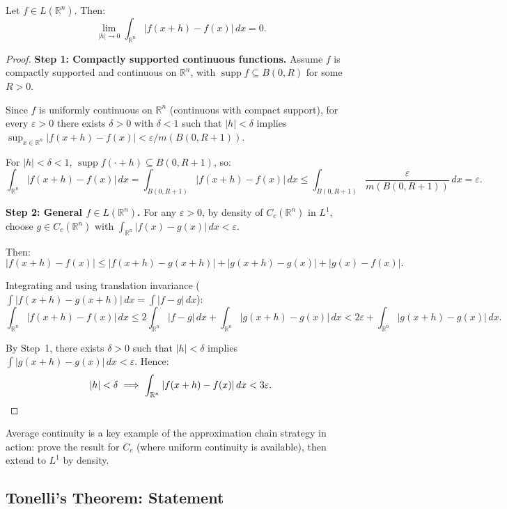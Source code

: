 \documentclass[11pt]{report}
\begin{document}
\begin{thmbox}
Let $f \in L(\mathbb{R}^n)$. Then:
\[
\lim_{|h| \to 0} \int_{\mathbb{R}^n} |f(x + h) - f(x)|\,dx = 0.
\]
\end{thmbox}

\begin{proof}
\textbf{Step 1: Compactly supported continuous functions.} Assume $f$ is compactly supported and continuous on $\mathbb{R}^n$, with $\operatorname{supp} f \subseteq B(0, R)$ for some $R > 0$.

Since $f$ is uniformly continuous on $\mathbb{R}^n$ (continuous with compact support), for every $\varepsilon > 0$ there exists $\delta > 0$ with $\delta < 1$ such that $|h| < \delta$ implies $\sup_{x \in \mathbb{R}^n} |f(x+h) - f(x)| < \varepsilon / m(B(0, R+1))$.

For $|h| < \delta < 1$, $\operatorname{supp} f(\cdot + h) \subseteq B(0, R+1)$, so:
\[
\int_{\mathbb{R}^n} |f(x+h) - f(x)|\,dx = \int_{B(0, R+1)} |f(x+h) - f(x)|\,dx \leq \int_{B(0, R+1)} \frac{\varepsilon}{m(B(0, R+1))}\,dx = \varepsilon.
\]

\textbf{Step 2: General $f \in L(\mathbb{R}^n)$.} For any $\varepsilon > 0$, by density of $C_c(\mathbb{R}^n)$ in $L^1$, choose $g \in C_c(\mathbb{R}^n)$ with $\int_{\mathbb{R}^n} |f(x) - g(x)|\,dx < \varepsilon$.

Then:
\[
|f(x+h) - f(x)| \leq |f(x+h) - g(x+h)| + |g(x+h) - g(x)| + |g(x) - f(x)|.
\]

Integrating and using translation invariance ($\int |f(x+h) - g(x+h)|\,dx = \int |f - g|\,dx$):
\[
\int_{\mathbb{R}^n} |f(x+h) - f(x)|\,dx \leq 2\int_{\mathbb{R}^n} |f - g|\,dx + \int_{\mathbb{R}^n} |g(x+h) - g(x)|\,dx < 2\varepsilon + \int_{\mathbb{R}^n} |g(x+h) - g(x)|\,dx.
\]

By Step~1, there exists $\delta > 0$ such that $|h| < \delta$ implies $\int |g(x+h) - g(x)|\,dx < \varepsilon$. Hence:
\[
|h| < \delta \implies \int_{\mathbb{R}^n} |f(x+h) - f(x)|\,dx < 3\varepsilon. \qedhere
\]
\end{proof}

\begin{rembox}
Average continuity is a key example of the approximation chain strategy in action: prove the result for $C_c$ (where uniform continuity is available), then extend to $L^1$ by density.
\end{rembox}

\subsection{Tonelli's Theorem: Statement}
\end{document}
